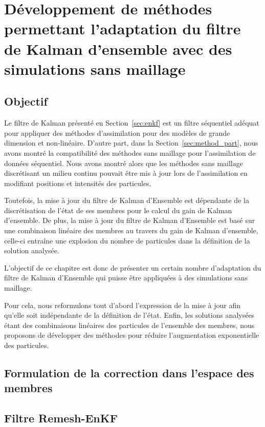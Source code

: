 
\section{Développement de méthodes permettant l'adaptation du filtre de Kalman d'ensemble avec des simulations sans maillage}

\subsection{Objectif}
Le filtre de Kalman présenté en Section~\ref*{sec:enkf} est un filtre séquentiel adéquat pour appliquer des méthodes d'assimilation pour des modèles de grande dimension et non-linéaire. D'autre part, dans la Section~\ref{sec:method_part}, nous avons montré la compatibilité des méthodes sans maillage pour l'assimilation de données séquentiel. Nous avons montré alors que les méthodes sans maillage discrétisant un milieu continu pouvait être mis à jour lors de l'assimilation en modifiant positions et intensités des particules.

Toutefois, la mise à jour du filtre de Kalman d'Ensemble est dépendante de la discrétisation de l'état de ses membres pour le calcul du gain de Kalman d'ensemble. De plus, la mise à jour du filtre de Kalman d'Ensemble est basé sur une combinaison linéaire des membres au travers du gain de Kalman d'ensemble, celle-ci entraîne une explosion du nombre de particules dans la définition de la solution analysée.

L'objectif de ce chapitre est donc de présenter un certain nombre d'adaptation du filtre de Kalman d'Ensemble qui puisse être appliquées à des simulations sans maillage.

Pour cela, nous reformulons tout d'abord l'expression de la mise à jour afin qu'elle soit indépendante de la définition de l'état.
Enfin, les solutions analysées étant des combinaisons linéaires des particules de l'ensemble des membres, nous proposons de développer des méthodes pour réduire l'augmentation exponentielle des particules.

\subsection{Formulation de la correction dans l'espace des membres}

\subsection{Filtre Remesh-EnKF}
